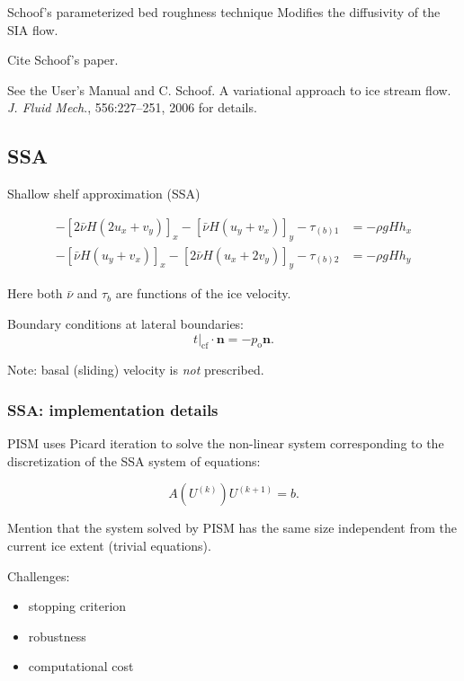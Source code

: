 \documentclass[hide notes,intlimits]{beamer}
\begin{document}
\begin{frame}{Schoof's parameterized bed roughness technique}
  Modifies the diffusivity of the SIA flow.

  Cite Schoof's paper.

  See the User's Manual and C. Schoof. A variational approach to ice
  stream flow. \emph{J. Fluid Mech}., 556:227–251, 2006 for details.
\end{frame}

\subsection{SSA}
\label{sec:ssa}

\begin{frame}{Shallow shelf approximation (SSA)}

  \begin{align}
    -\left[ 2\bar\nu H\left( 2u_{x} + v_{y}\right)\right]_{x} - \left[\bar\nu
    H\left(u_{y}+v_{x} \right) \right]_{y} - \tau_{(b)1} &= - \rho gH h_{x} \\
    -\left[ \bar\nu H\left( u_{y} + v_{x} \right)\right]_{x} - \left[2\bar\nu
    H\left(u_{x}+2v_{y}  \right) \right]_{y} - \tau_{(b)2} &= -\rho gH h_{y}
  \end{align}

  Here both $\bar \nu$ and $\tau_{b}$ are functions of the ice velocity.

  Boundary conditions at lateral boundaries:
  \begin{equation}
    \label{eq:5}
    \left.t\right|_{\text{cf}} \cdot \mathbf{n} = -p_{\text{o}} \mathbf{n}.
  \end{equation}

  Note: basal (sliding) velocity is \emph{not} prescribed.

\end{frame}

\begin{frame}
  \frametitle{SSA: implementation details}

  PISM uses Picard iteration to solve the non-linear system
  corresponding to the discretization of the SSA system of equations:

  \begin{equation}
    \label{eq:4}
    A(U^{(k)}) U^{(k+1)} = b.
  \end{equation}

  Mention that the system solved by PISM has the same size independent
  from the current ice extent (trivial equations).

  Challenges:
  \begin{itemize}
  \item stopping criterion
  \item robustness
  \item computational cost
  \end{itemize}
\end{frame}
\end{document}
